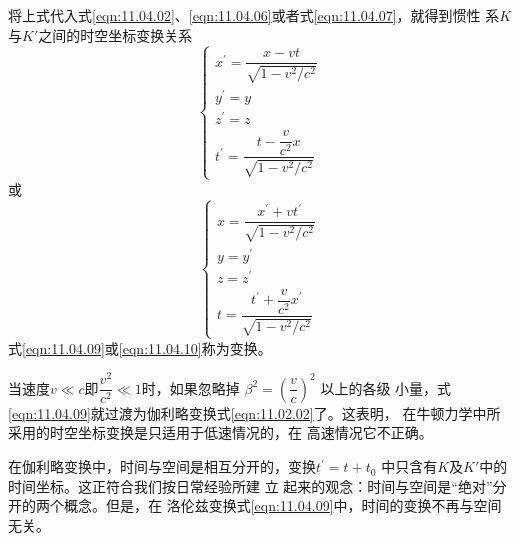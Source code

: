 将上式代入式\eqref{eqn:11.04.02}、\eqref{eqn:11.04.06}或者式\eqref{eqn:11.04.07}，就得到惯性
系$ K $与$ K' $之间的时空坐标变换关系
\begin{equation}\label{eqn:11.04.09}
  \begin{cases}
    x ^ { \prime } = \dfrac { x - v t } { \sqrt { 1 - v ^ 2 / c ^ 2 } } \\
    y ^ { \prime } = y                                                  \\
    z ^ { \prime } = z                                                  \\
    t ^ { \prime } = \dfrac { t - \dfrac v { c ^ 2 } x } { \sqrt { 1 - v ^ 2 / c ^ 2 } }
  \end{cases}
\end{equation}
或
\begin{equation}\label{eqn:11.04.10}
  \begin{cases}
    x = \dfrac { x ^ { \prime } + v t ^ { \prime } } { \sqrt { 1 - v ^ 2 / c ^ 2 } } \\
    y = y ^ { \prime }                                                               \\
    z = z ^ { \prime }                                                               \\
    t = \dfrac { t ^ { \prime } + \dfrac v { c ^ 2 } x ^ { \prime } } { \sqrt { 1 - v ^ 2 / c ^ 2 } }
  \end{cases}
\end{equation}
式\eqref{eqn:11.04.09}或\eqref{eqn:11.04.10}称为变换。

当速度$ v \ll c $即$ \dfrac { v ^ { 2 } } { c ^ { 2 } } \ll 1 $时，如果忽略掉
$ \beta ^ { 2 } = \left( \dfrac { v } { c } \right) ^ { 2 } $
以上的各级
小量，式\eqref{eqn:11.04.09}就过渡为伽利略变换\lhbrak 式\eqref{eqn:11.02.02}\rhbrak 了。这表明，
在牛顿力学中所采用的时空坐标变换是只适用于低速情况的，在
高速情况它不正确。

在伽利略变换中，时间与空间是相互分开的，变换$ t ^ { \prime } = t + t _ { 0 } $
中只含有$ K $及$ K ' $中的时间坐标。这正符合我们按日常经验所建
立
起来的观念：时间与空间是“绝对”分开的两个概念。但是，在
洛伦兹变换\lhbrak 式\eqref{eqn:11.04.09}\rhbrak 中，时间的变换不再与空间无关。
